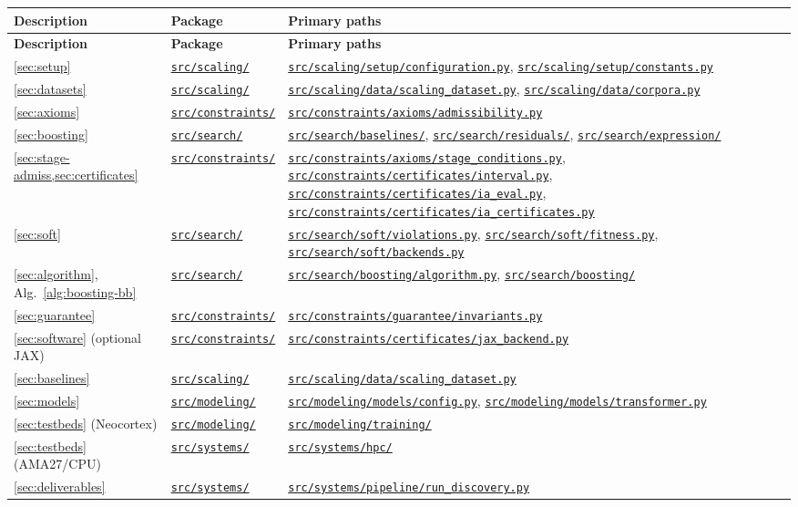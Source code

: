 \documentclass[11pt]{article}
\newcommand{\repoBlob}{https://github.com/krichelj/ByteBoost-Shape-Constrained-Boosted-SR/blob/main/}
\newcommand{\repoTree}{https://github.com/krichelj/ByteBoost-Shape-Constrained-Boosted-SR/tree/main/}
\newcommand{\pyFile}[1]{\href{\repoBlob#1}{\nolinkurl{#1}}}
\newcommand{\pyDir}[1]{\href{\repoTree#1}{\nolinkurl{#1/}}}
\theoremstyle{plain}
\theoremstyle{remark}
\begin{document}
{\small
\setlength{\tabcolsep}{4pt}
\begin{longtable}{@{}>{\raggedright\arraybackslash}p{}
  l
  >{\raggedright\arraybackslash}p{}@{}}
\toprule
\textbf{Description} & \textbf{Package} & \textbf{Primary paths} \\
\midrule
\endfirsthead
\toprule
\textbf{Description} & \textbf{Package} & \textbf{Primary paths} \\
\midrule
\endhead
\bottomrule
\endfoot
\cref{sec:setup} & \pyDir{src/scaling} & \pyFile{src/scaling/setup/configuration.py}, \pyFile{src/scaling/setup/constants.py} \\
\cref{sec:datasets} & \pyDir{src/scaling} & \pyFile{src/scaling/data/scaling_dataset.py}, \pyFile{src/scaling/data/corpora.py} \\
\cref{sec:axioms} & \pyDir{src/constraints} & \pyFile{src/constraints/axioms/admissibility.py} \\
\cref{sec:boosting} & \pyDir{src/search} & \pyDir{src/search/baselines}, \pyDir{src/search/residuals}, \pyDir{src/search/expression} \\
\cref{sec:stage-admiss,sec:certificates} & \pyDir{src/constraints} & \pyFile{src/constraints/axioms/stage_conditions.py}, \pyFile{src/constraints/certificates/interval.py}, \pyFile{src/constraints/certificates/ia_eval.py}, \pyFile{src/constraints/certificates/ia_certificates.py} \\
\cref{sec:soft} & \pyDir{src/search} & \pyFile{src/search/soft/violations.py}, \pyFile{src/search/soft/fitness.py}, \pyFile{src/search/soft/backends.py} \\
\cref{sec:algorithm}, Alg.~\ref{alg:boosting-bb} & \pyDir{src/search} & \pyFile{src/search/boosting/algorithm.py}, \pyDir{src/search/boosting} \\
\cref{sec:guarantee} & \pyDir{src/constraints} & \pyFile{src/constraints/guarantee/invariants.py} \\
\cref{sec:software} (optional JAX) & \pyDir{src/constraints} & \pyFile{src/constraints/certificates/jax_backend.py} \\
\cref{sec:baselines} & \pyDir{src/scaling} & \pyFile{src/scaling/data/scaling_dataset.py} \\
\cref{sec:models} & \pyDir{src/modeling} & \pyFile{src/modeling/models/config.py}, \pyFile{src/modeling/models/transformer.py} \\
\cref{sec:testbeds} (Neocortex) & \pyDir{src/modeling} & \pyDir{src/modeling/training} \\
\cref{sec:testbeds} (AMA27/CPU) & \pyDir{src/systems} & \pyDir{src/systems/hpc} \\
\cref{sec:deliverables} & \pyDir{src/systems} & \pyFile{src/systems/pipeline/run_discovery.py} \\
\end{longtable}
}
\end{document}
